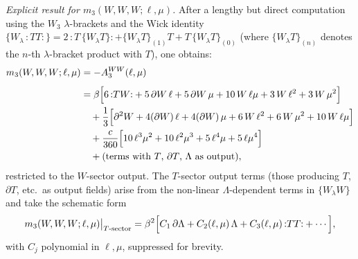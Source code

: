 \smallskip
\emph{Explicit result for $m_3(W,W,W;\ell,\mu)$.}
After a lengthy but direct computation using the $W_3$ $\lambda$-brackets
and the Wick identity
$\{W_\lambda\, {:}TT{:}\}
 = 2\,{:}T\,\{W_\lambda T\}{:}
 + \{W_\lambda T\}_{(1)} T
 + T\,\{W_\lambda T\}_{(0)}$
(where $\{W_\lambda T\}_{(n)}$ denotes the $n$-th $\lambda$-bracket
product with $T$), one obtains:
\begin{align}
\label{eq:m3-WWW}
m_3(W,W,W;\ell,\mu)
&= -A_3^{WW}(\ell,\mu) \notag\\[4pt]
&= \beta\Bigl[
 6\,{:}TW{:}
 + 5\,\partial W\,\ell
 + 5\,\partial W\,\mu
 + 10\,W\,\ell\mu
 + 3\,W\,\ell^2
 + 3\,W\,\mu^2
 \Bigr] \notag\\
&\quad + \frac{1}{3}\Bigl[
 \partial^2 W
 + 4(\partial W)\,\ell
 + 4(\partial W)\,\mu
 + 6\,W\,\ell^2
 + 6\,W\,\mu^2
 + 10\,W\,\ell\mu
 \Bigr] \notag\\
&\quad + \frac{c}{360}\Bigl[
 10\,\ell^3\mu^2
 + 10\,\ell^2\mu^3
 + 5\,\ell^4\mu
 + 5\,\ell\mu^4
 \Bigr] \notag\\
&\quad + \text{(terms with $T$, $\partial T$, $\Lambda$ as output)},
\end{align}
restricted to the $W$-sector output.
The $T$-sector output terms (those producing $T$, $\partial T$, etc.\
as output fields) arise from the non-linear $\Lambda$-dependent
terms in $\{W_\lambda W\}$ and take the schematic form
\begin{equation}
\label{eq:m3-WWW-T-sector}
m_3(W,W,W;\ell,\mu)\big|_{T\text{-sector}}
= \beta^2\Bigl[
 C_1\,\partial\Lambda
 + C_2(\ell,\mu)\,\Lambda
 + C_3(\ell,\mu)\,{:}TT{:}
 + \cdots
 \Bigr],
\end{equation}
with $C_j$ polynomial in $\ell, \mu$, suppressed for brevity.

